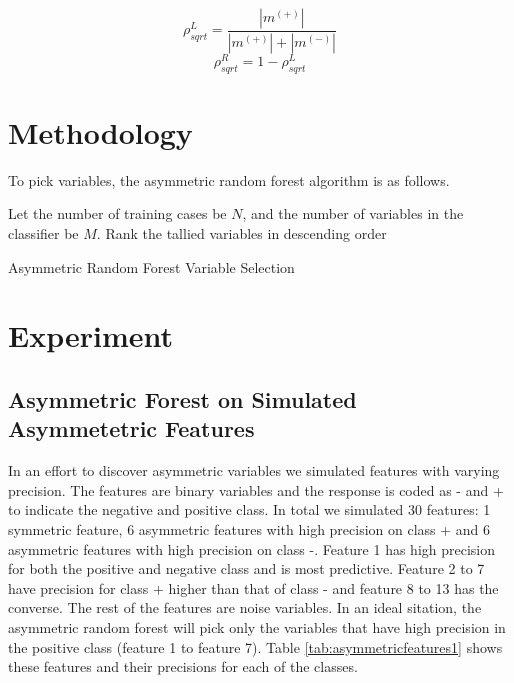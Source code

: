\documentclass[twoside,11pt]{article}
\begin{document}
 \begin{equation}\label{eqn:rho_sqrt}
	\rho_{sqrt}^L = \frac{|m^{(+)}|}{|m^{(+)}|+|m^{(-)}|}
\end{equation}
\begin{equation}
	\rho_{sqrt}^R = 1- \rho_{sqrt}^L
\end{equation}


\section{Methodology}
To pick variables, the asymmetric random forest algorithm is as follows.

\begin{algorithm}
Let the number of training cases be $N$, and the number of variables in the classifier be $M$.
Rank the tallied variables in descending order 

\caption{Asymmetric Random Forest Variable Selection}\label{algo: AsymRandomForest}
\end{algorithm}

\section{Experiment}
\subsection{Asymmetric Forest on Simulated Asymmetetric Features}
In an effort to discover asymmetric variables we simulated features with varying precision. The features are binary variables and the response is coded as - and + to indicate the negative and positive class. In total we simulated 30 features: 1 symmetric feature, 6 asymmetric features with high precision on class + and 6 asymmetric features with high precision on class -. Feature 1 has high precision for both the positive and negative class and is most predictive. Feature 2 to 7 have precision for class + higher than that of class - and feature 8 to 13 has the converse. The rest of the features are noise variables. In an ideal sitation, the asymmetric random forest will pick only the variables that have high precision in the positive class (feature 1 to feature 7). Table \ref{tab:asymmetricfeatures1} shows these features and their precisions for each of the classes. 
\end{document}
